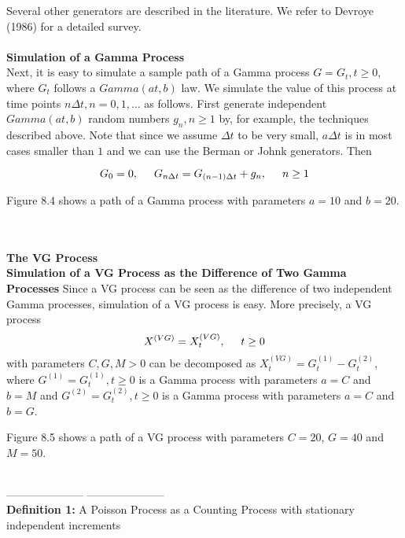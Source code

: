 Several other generators are described in the literature. We refer to Devroye (1986) for a detailed survey.
~\\\\
\textbf{Simulation of a Gamma Process} \\
Next, it is easy to simulate a sample path of a Gamma process $G = {G_t , t\geq0}$, where $G_t$ follows a $Gamma(at, b)$ law. We simulate the value of this process at time points ${n\Delta t, n=0, 1, \ldots}$ as follows. First generate independent $Gamma(at, b)$ random numbers ${g_n, n\geq1}$ by, for example, the techniques described above. Note that since we assume $\Delta t$ to be very small, $a\Delta t$ is in most cases smaller than $1$ and we can use the Berman or Johnk generators. Then

\begin{equation}
G_0 = 0,\hspace{0.5cm} G_{n\Delta t} = G_{(n-1)\Delta t} + g_n, \hspace{0.5cm} n\geq1
\end{equation} 

Figure 8.4 shows a path of a Gamma process with parameters $a=10$ and $b=20$.

~\\\\
\textbf{The VG Process}\\
\textbf{Simulation of a VG Process as the Difference of Two Gamma Processes}
Since a VG process can be seen as the difference of two independent Gamma processes, simulation of a VG process is easy. More precisely, a VG process
\begin{equation}
X^{(VG)} = {X_{t}^{(VG)}, \hspace{0.5cm}t\geq0}
\end{equation} 
with parameters $C, G, M > 0$ can be decomposed as $X_{t}^{(VG)} = G_{t}^{(1)} - G_{t}^{(2)}$, where $G^{(1)} = {G_{t}^{(1)}, t\geq0}$ is a Gamma process with parameters $a=C$ and $b=M$ and $G^{(2)} = {G_{t}^{(2)}, t\geq0}$ is a Gamma process with parameters $a=C$ and $b=G$.

Figure 8.5 shows a path of a VG process with parameters $C=20$, $G=40$ and $M=50$.

~\\
---------------------
---------------------\\
\textbf{Definition 1:} A Poisson Process as a Counting Process with stationary independent increments

